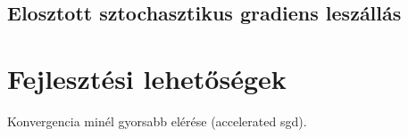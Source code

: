 \documentclass[a4paper,12pt]{article}
\begin{document}
\subsection{Elosztott sztochasztikus gradiens leszállás}

\section{Fejlesztési lehetőségek}

Konvergencia minél gyorsabb elérése (accelerated sgd). 

\end{document}
